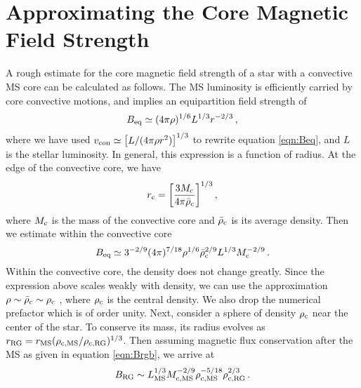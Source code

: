 \section{Approximating the Core Magnetic Field Strength}

A rough estimate for the core magnetic field strength of a star with a convective MS core can be calculated as follows. The MS luminosity is efficiently carried by core convective motions, and implies an equipartition field strength of 
\begin{equation}
\label{eqn:Beq2}
B_{\rm eq} \simeq (4 \pi \rho)^{1/6} L^{1/3} r^{-2/3} \, ,
\end{equation}
where we have used $v_{\rm con} \simeq \big[L/(4 \pi \rho r^2)\big]^{1/3}$ to rewrite equation \ref{eqn:Beq}, and $L$ is the stellar luminosity. In general, this expression is a function of radius. At the edge of the convective core, we have
\begin{equation}
\label{eqn:rc}
r_{\rm c} = \bigg[ \frac{3 M_{\rm c}}{4 \pi {\bar \rho}_{\rm c}} \bigg]^{1/3} \, ,
\end{equation}
where $M_{\rm c}$ is the mass of the convective core and ${\bar \rho}_{\rm c}$ is its average density. Then we estimate within the convective core
\begin{equation}
\label{eqn:Beq3}
B_{\rm eq} \simeq 3^{-2/9} (4 \pi)^{7/18} \rho^{1/6} {\bar \rho}_{\rm c}^{2/9} L^{1/3} M_{\rm c}^{-2/9} \, .
\end{equation}
Within the convective core, the density does not change greatly. Since the expression above scales weakly with density, we can use the approximation $\rho \sim {\bar \rho}_{\rm c} \sim \rho_{\rm c}$ , where $\rho_{\rm c}$ is the central density. We also drop the numerical prefactor which is of order unity. Next, consider a sphere of density $\rho_{\rm c}$ near the center of the star. To conserve its mass, its radius evolves as $r_{\rm RG} = r_{\rm MS} (\rho_{\rm c,MS}/\rho_{\rm c,RG})^{1/3}$. Then assuming magnetic flux conservation after the MS as given in equation \ref{eqn:Brgb}, we arrive at 
\begin{equation}
\label{eqn:Bcen}
B_{\rm RG} \sim L_{\rm MS}^{1/3} M_{\rm c,MS}^{-2/9} \rho_{\rm c,MS}^{-5/18} \rho_{\rm c,RG}^{2/3} \, .
\end{equation}

